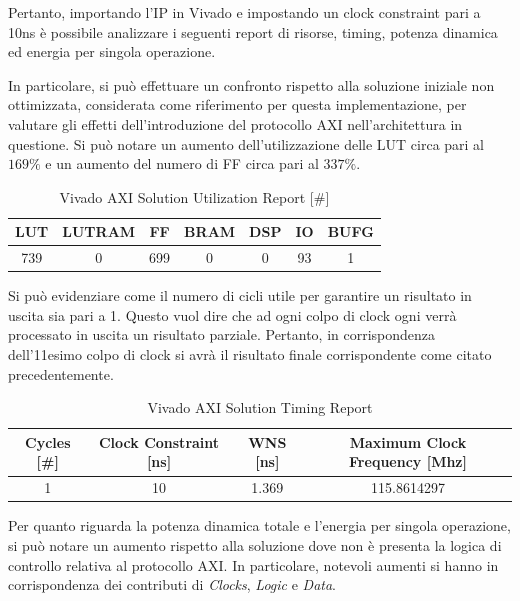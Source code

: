 Pertanto, importando l'IP in Vivado e impostando un clock constraint pari a 10ns è possibile analizzare i seguenti report di risorse, timing, potenza dinamica ed energia per singola operazione.


In particolare, si può effettuare un confronto rispetto alla soluzione iniziale non ottimizzata, considerata come riferimento per questa implementazione, per valutare gli effetti dell'introduzione del protocollo AXI nell'architettura in questione. Si può notare un aumento dell'utilizzazione delle LUT circa pari al $169\%$ e un aumento del numero di FF circa pari al $337\%$. 
\begin{table}[H]
	\centering
	\begin{tabular}{|c|c|c|c|c|c|c|}
		\hline
		\textbf{LUT} & \textbf{LUTRAM} & \textbf{FF} & \textbf{BRAM} & \textbf{DSP} & \textbf{IO} & \textbf{BUFG} \\
		\hline
		739 & 0 & 699 & 0 & 0 & 93 & 1 \\
		\hline
	\end{tabular}
	\caption{Vivado AXI Solution Utilization Report [\#]}
	\label{tab:vivado-axi-solution-utilization-report}
\end{table}

Si può evidenziare come il numero di cicli utile per garantire un risultato in uscita sia pari a 1. Questo vuol dire che ad ogni colpo di clock ogni verrà processato in uscita un risultato parziale. Pertanto, in corrispondenza dell'11esimo colpo di clock si avrà il risultato finale corrispondente come citato precedentemente.

\begin{table}[H]
	\centering
	\begin{tabular}{|c|c|c|c|}
		\hline
		\textbf{Cycles} [\#] & \textbf{Clock Constraint} [ns] & \textbf{WNS} [ns] & \textbf{Maximum Clock Frequency} [Mhz] \\
		\hline
		1 & 10 & 1.369 & 115.8614297 \\
		\hline
	\end{tabular}
	\caption{Vivado AXI Solution Timing Report}
	\label{tab:vivado-axi-solution-timing-report}
\end{table}

Per quanto riguarda la potenza dinamica totale e l'energia per singola operazione, si può notare un aumento rispetto alla soluzione dove non è presenta la logica di controllo relativa al protocollo AXI. In particolare, notevoli aumenti si hanno in corrispondenza dei contributi di \textit{Clocks}, \textit{Logic} e \textit{Data}.

